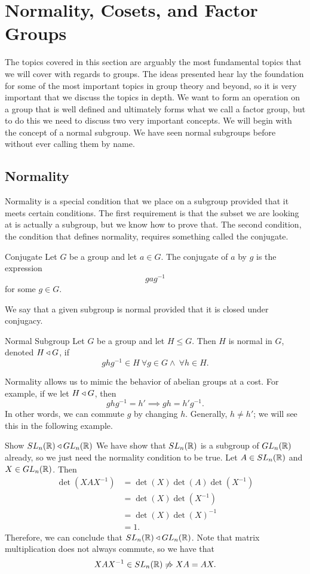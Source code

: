 \section{Normality, Cosets, and Factor Groups}

The topics covered in this section are arguably the most fundamental topics that we will cover with regards to groups. The ideas presented hear lay the foundation for some of the most important topics in group theory and beyond, so it is very important that we discuss the topics in depth.
We want to form an operation on a group that is well defined and ultimately forms what we call a factor group, but to do this we need to discuss two very important concepts. We will begin with the concept of a normal subgroup. We have seen normal subgroups before without ever calling them by name.

\subsection*{Normality}
Normality is a special condition that we place on a subgroup provided that it meets certain conditions. The first requirement is that the subset we are looking at is actually a subgroup, but we know how to prove that. The second condition, the condition that defines normality, requires something called the conjugate.
\begin{definition}{Conjugate}
	Let $G$ be a group and let $a\in G$. The conjugate of $a$ by $g$ is the expression
	\[
		gag^{-1}
	\]
	for some $g\in G$.
\end{definition}
We say that a given subgroup is normal provided that it is closed under conjugacy.
\begin{definition}{Normal Subgroup}
	Let $G$ be a group and let $H\leq G$. Then $H$ is normal in $G$, denoted $H\triangleleft G$, if
	\[
		ghg^{-1}\in H\ \forall g\in G\land\ \forall h\in H.
	\]
\end{definition}

Normality allows us to mimic the behavior of abelian groups at a cost. For example, if we let $H\triangleleft G$, then
\[
	ghg^{-1}=h'\implies gh=h'g^{-1}.
\]
In other words, we can commute $g$ by changing $h$. Generally, $h\neq h'$; we will see this in the following example.

\begin{example}{Show $SL_{n}(\mathbb{R})\triangleleft GL_{n}(\mathbb{R})$}
	We have show that $SL_{n}(\mathbb{R})$ is a subgroup of $GL_{n}(\mathbb{R})$ already, so we just need the normality condition to be true. Let $A\in SL_{n}(\mathbb{R})$ and $X\in GL_{n}(\mathbb{R})$. Then
	\begin{align*}
		\det(XAX^{-1}) & =\det(X)\det(A)\det(X^{-1}) \\
		               & =\det(X)\det(X^{-1})        \\
		               & =\det(X)\det(X)^{-1}        \\
		               & =1.
	\end{align*}
	Therefore, we can conclude that $SL_{n}(\mathbb{R})\triangleleft GL_{n}(\mathbb{R})$. Note that matrix multiplication does not always commute, so we have that
	\[
		XAX^{-1}\in SL_{n}(\mathbb{R})\not\Rightarrow XA=AX.
	\]
\end{example}

